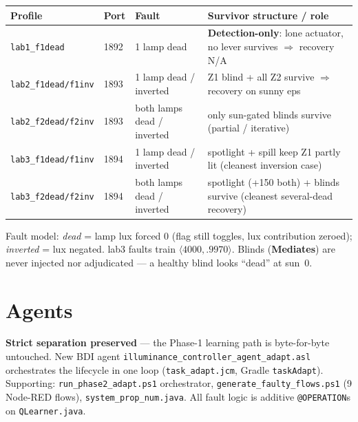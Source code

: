 \documentclass[10pt,a4paper]{article}
\newcommand{\file}[1]{\texttt{\small #1}}
\newcommand{\kw}[1]{\textbf{#1}}
\begin{document}
\begin{center}\footnotesize
\begin{tabular}{@{}lllp{6.6cm}@{}}
\toprule
\rowcolor{boxgrey} Profile & Port & Fault & Survivor structure / role\\
\midrule
\file{lab1\_f1dead} & 1892 & 1 lamp dead & \kw{Detection-only}: lone actuator, no lever survives \(\Rightarrow\) recovery N/A\\
\file{lab2\_f1dead/f1inv} & 1893 & 1 lamp dead / inverted & Z1 blind + all Z2 survive \(\Rightarrow\) recovery on sunny eps\\
\file{lab2\_f2dead/f2inv} & 1893 & both lamps dead / inverted & only sun-gated blinds survive (partial / iterative)\\
\file{lab3\_f1dead/f1inv} & 1894 & 1 lamp dead / inverted & spotlight + spill keep Z1 partly lit (cleanest inversion case)\\
\file{lab3\_f2dead/f2inv} & 1894 & both lamps dead / inverted & spotlight (+150 both) + blinds survive (cleanest several-dead recovery)\\
\bottomrule
\end{tabular}
\end{center}
Fault model: \emph{dead} = lamp lux forced \(0\) (flag still toggles, lux contribution zeroed);
\emph{inverted} = lux negated. lab3 faults train \(\langle4000,.9970\rangle\). Blinds (\kw{Mediates}) are
never injected nor adjudicated — a healthy blind looks ``dead'' at sun~0.

\section{Agents}
\kw{Strict separation preserved} — the Phase-1 learning path is byte-for-byte untouched. New BDI agent
\file{illuminance\_controller\_agent\_adapt.asl} orchestrates the lifecycle in one loop
(\file{task\_adapt.jcm}, Gradle \file{taskAdapt}). Supporting: \file{run\_phase2\_adapt.ps1} orchestrator,
\file{generate\_faulty\_flows.ps1} (9 Node-RED flows), \file{system\_prop\_num.java}. All fault logic is
additive \file{@OPERATION}s on \file{QLearner.java}.
\end{document}
